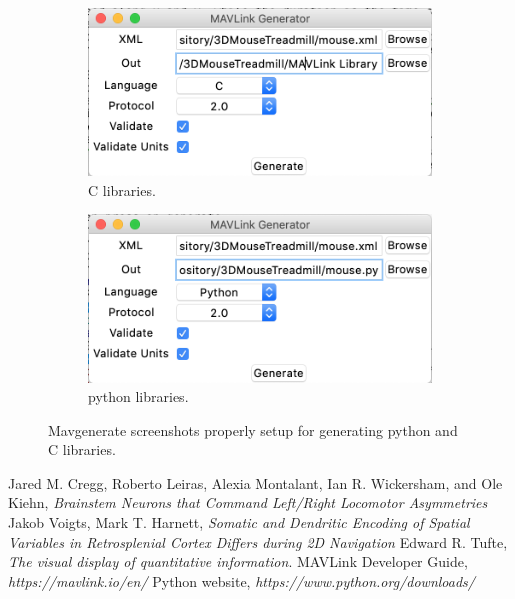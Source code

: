 \documentclass[12pt,a4paper, twoside]{article}
\begin{document}
\begin{figure}[H]
	\centering
	\begin{subfigure}[b]{0.4\textwidth}
		\includegraphics[width=\textwidth]{fig/gen_c}
		\caption{C libraries.}
		\label{fig:gen_c}
	\end{subfigure}
	\begin{subfigure}[b]{0.4\textwidth}
		\includegraphics[width=\textwidth]{fig/gen_py}
		\caption{python libraries.}
		\label{fig:gen_py}
	\end{subfigure}
	\caption[Mavgenerate screenshots]{Mavgenerate screenshots properly setup for generating python and C libraries.}
\end{figure}

\newpage
\lhead{ }
\begin{thebibliography}{100}
	
	Jared M. Cregg, Roberto Leiras, Alexia Montalant, Ian R. Wickersham, and Ole Kiehn, \textit{Brainstem Neurons that Command Left/Right Locomotor Asymmetries} 
	 Jakob Voigts, Mark T. Harnett, \textit{Somatic and Dendritic Encoding of Spatial Variables in Retrosplenial Cortex Differs during 2D Navigation}
	 Edward R. Tufte, \textit{The visual display of quantitative information}.
	 MAVLink Developer Guide, \textit{https://mavlink.io/en/}
	 Python website, \textit{https://www.python.org/downloads/}

	
\end{thebibliography}

\listoffigures
\listoftables
\newpage
\appendix
\end{document}
